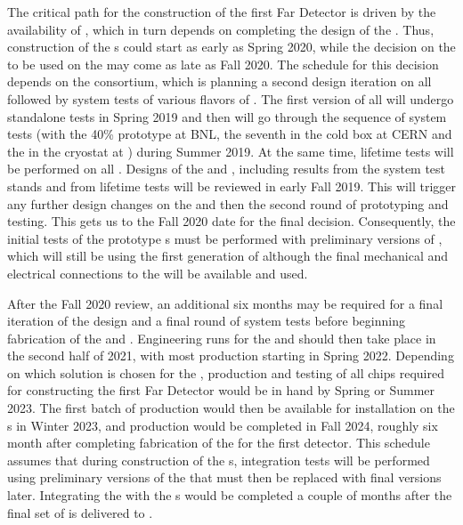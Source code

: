 The critical path for the construction of the first 
 Far Detector is driven by the availability of ,
which in turn depends on completing the design of the
. Thus, construction
of the s could start as early as Spring 2020, while the
decision on the  to be used on the 
may come as late as Fall 2020. The schedule for this decision
depends on the  consortium, which is
planning a second design iteration on all 
followed by system tests of various flavors of .
The first version of all  will undergo
standalone tests in Spring 2019 and then will go through the 
sequence of system tests (with the 40\%  prototype at BNL,
the seventh   in the cold box at CERN
and the  in the  cryostat at )
during Summer 2019. At the same time, lifetime tests will be performed 
on all . Designs of the  and , including results
from the system test stands and from lifetime tests will be reviewed
in early Fall 2019. This will trigger any further design
changes on the  and then the second round of prototyping
and testing. This gets us to the Fall 2020 date for the final
 decision. Consequently, the initial
tests of the  prototype s must be performed
with preliminary versions of , which will still be using
the first generation of  although the final 
mechanical and electrical connections to the  will be available and used.

After the Fall 2020 review, an additional six months may be 
required for a final iteration of the  design
and a final round of system tests before beginning fabrication
of the  and . Engineering runs
for the  and  should then take place in the
second half of 2021, with most production starting in
Spring 2022. Depending on which solution is chosen for the
, production and testing of all chips required
for constructing the first   Far Detector
would be in hand by Spring or Summer 2023. The first batch of
production  would then be available for installation on
the s in Winter 2023, and production would be
completed in Fall 2024, roughly six month after completing
fabrication of the  for the first detector.
This schedule assumes that during construction of the 
s, integration tests will be performed using preliminary
versions of the  that must then be replaced
with final versions later. Integrating the 
with the s would be completed a couple of months after
the final set of  is delivered to .

